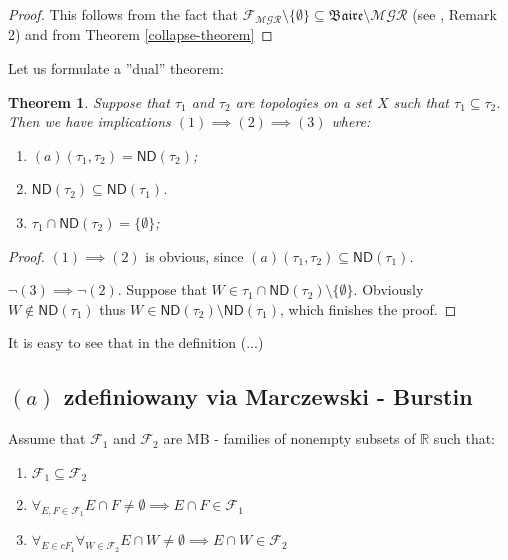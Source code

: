 \documentclass[12pt]{amsart}
\theoremstyle{plain}
\newtheorem{theorem}{Theorem}[section]
\theoremstyle{definition}
\theoremstyle{remark}
\newcommand{\Baire}{\mathfrak{Baire}}
\newcommand{\meager}{{\mathcal{MGR}}}
\newcommand{\real}{\mathbb{R}}
\newcommand{\cF}{{\mathcal F}}
\newcommand{\aideal}{\mathit{(a)}}
\begin{document}
\begin{proof}
This follows from the fact that 
$\cF_{\meager} \setminus\lbrace\emptyset\rbrace\subseteq \Baire\setminus\meager$
(see \cite{PWBW}, Remark 2) and
from Theorem \ref{collapse-theorem}
\end{proof}

Let us formulate a ''dual'' theorem:

\begin{theorem}
Suppose that $\tau_1$ and $\tau_2$ are topologies on a set $X$ such
that $\tau_1 \subseteq \tau_2$.
Then we have implications $(1) \implies (2) \implies (3)$
where:
\begin{enumerate}
\item $\aideal(\tau_1, \tau_2) = \mathsf{ND}(\tau_2)$;
\item $\mathsf{ND}(\tau_2) \subseteq \mathsf{ND}(\tau_1)$.
\item $\tau_1 \cap \mathsf{ND}(\tau_2) = \lbrace \emptyset \rbrace$;
\end{enumerate}
\end{theorem}

\begin{proof}
$(1)\implies (2)$ is obvious, since
$\aideal(\tau_1, \tau_2) \subseteq \mathsf{ND}(\tau_1)$.

$\neg(3)\implies \neg(2)$.
Suppose that $W\in\tau_1\cap\mathsf{ND}(\tau_2) \setminus \lbrace\emptyset\rbrace$.
Obviously $W\not\in\mathsf{ND}(\tau_1)$ thus
$W \in \mathsf{ND}(\tau_2) \setminus \mathsf{ND}(\tau_1)$,
which finishes the proof.
\end{proof}

It is easy to see that in the definition (...)


\subsection{$\aideal$ zdefiniowany via Marczewski - Burstin}

Assume that $\cF_1$ and $\cF_2$ are MB - families of nonempty 
subsets of $\real$ such that:
\begin{enumerate}	
\item
\label{mb-condition-subset}
  $\cF_1 \subseteq \cF_2$
\item 
\label{mb-condition-f1}
  $\forall_{E,F \in \cF_1} E \cap F \not= \emptyset \implies E \cap F \in \cF_1$
\item
\label{mb-condition-f1f2}
  $\forall_{E \in cF_1} \forall_{W \in \cF_2} E \cap W \not= \emptyset \implies E \cap W \in \cF_2$  
\end{enumerate}	
\end{document}
